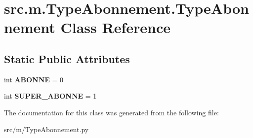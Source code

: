 \hypertarget{classsrc_1_1m_1_1_type_abonnement_1_1_type_abonnement}{}\section{src.\+m.\+Type\+Abonnement.\+Type\+Abonnement Class Reference}
\label{classsrc_1_1m_1_1_type_abonnement_1_1_type_abonnement}
\subsection*{Static Public Attributes}
\begin{DoxyCompactItemize}
\item 
\hypertarget{classsrc_1_1m_1_1_type_abonnement_1_1_type_abonnement_a8777c654fd33af93f2ac908be1755548}{}int {\bfseries A\+B\+O\+N\+N\+E} = 0\label{classsrc_1_1m_1_1_type_abonnement_1_1_type_abonnement_a8777c654fd33af93f2ac908be1755548}

\item 
\hypertarget{classsrc_1_1m_1_1_type_abonnement_1_1_type_abonnement_aa16145cba196ca517ea421d9b0aeea3a}{}int {\bfseries S\+U\+P\+E\+R\+\_\+\+A\+B\+O\+N\+N\+E} = 1\label{classsrc_1_1m_1_1_type_abonnement_1_1_type_abonnement_aa16145cba196ca517ea421d9b0aeea3a}

\end{DoxyCompactItemize}


The documentation for this class was generated from the following file\+:\begin{DoxyCompactItemize}
\item 
src/m/Type\+Abonnement.\+py\end{DoxyCompactItemize}
